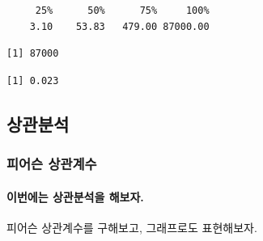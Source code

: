 \documentclass[]{article}
\newenvironment{Shaded}{\begin{snugshade}}{\end{snugshade}}
\newcommand{\KeywordTok}[1]{\textcolor[rgb]{0.13,0.29,0.53}{\textbf{#1}}}
\newcommand{\DecValTok}[1]{\textcolor[rgb]{0.00,0.00,0.81}{#1}}
\newcommand{\FloatTok}[1]{\textcolor[rgb]{0.00,0.00,0.81}{#1}}
\newcommand{\OperatorTok}[1]{\textcolor[rgb]{0.81,0.36,0.00}{\textbf{#1}}}
\newcommand{\NormalTok}[1]{#1}
\let\oldparagraph\paragraph
\renewcommand{\paragraph}[1]{\oldparagraph{#1}\mbox{}}
\begin{document}
\begin{Shaded}
\end{Shaded}

\begin{verbatim}
     25%      50%      75%     100% 
    3.10    53.83   479.00 87000.00 
\end{verbatim}

\begin{Shaded}
\end{Shaded}

\begin{verbatim}
[1] 87000
\end{verbatim}

\begin{Shaded}
\end{Shaded}

\begin{verbatim}
[1] 0.023
\end{verbatim}

\subsection{상관분석}

\subsubsection{피어슨 상관계수}\label{-}

\paragraph{이번에는 상관분석을 해보자.}\label{--.}

피어슨 상관계수를 구해보고, 그래프로도 표현해보자.\newline \newline
\end{document}
